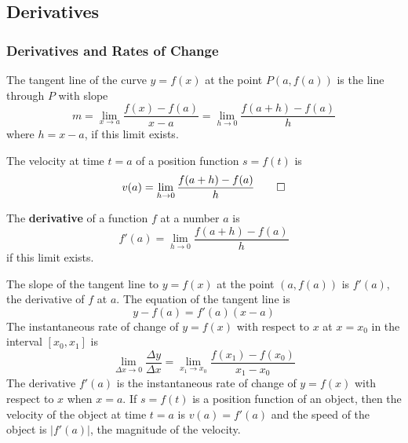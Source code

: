 \subsection{Derivatives}
\subsubsection{Derivatives and Rates of Change}
\begin{definition}
    The tangent line of the curve \(y=f(x)\) at the point \(P(a, f(a))\) is
    the line through \(P\) with slope
    \[m=\lim_{x\to a}\frac{f(x)-f(a)}{x-a}
    =\lim_{h\to 0}\frac{f(a+h)-f(a)}{h}\]
    where \(h=x-a\), if this limit exists.
\end{definition}
\begin{definition}
    The velocity at time \(t=a\) of a position function \(s=f(t)\) is
    \[v(a)=\lim_{h\to 0}\frac{f(a+h)-f(a)}{h}\qedhere\]
\end{definition}
\begin{definition}
    The \textbf{derivative} of a function \(f\) at a number \(a\) is
    \[f'(a)=\lim_{h\to 0}\frac{f(a+h)-f(a)}{h}\]
    if this limit exists.
\end{definition}
The slope of the tangent line to \(y=f(x)\) at the point \((a,f(a))\) is
\(f'(a)\), the derivative of \(f\) at \(a\).
The equation of the tangent line is
\[y-f(a)=f'(a)(x-a)\]
The instantaneous rate of change of \(y=f(x)\) with respect to \(x\) at
\(x=x_0\) in the interval \([x_0,x_1]\) is
\[\lim_{\Delta x\to 0}\frac{\Delta y}{\Delta x}
=\lim_{x_1 \to x_0}\frac{f(x_1)-f(x_0)}{x_1-x_0}\]
The derivative \(f'(a)\) is the instantaneous rate of change of \(y=f(x)\)
with respect to \(x\) when \(x=a\).
If \(s=f(t)\) is a position function of an object, then the velocity of the
object at time \(t=a\) is \(v(a)=f'(a)\) and the speed of the object is
\(|f'(a)|\), the magnitude of the velocity.

